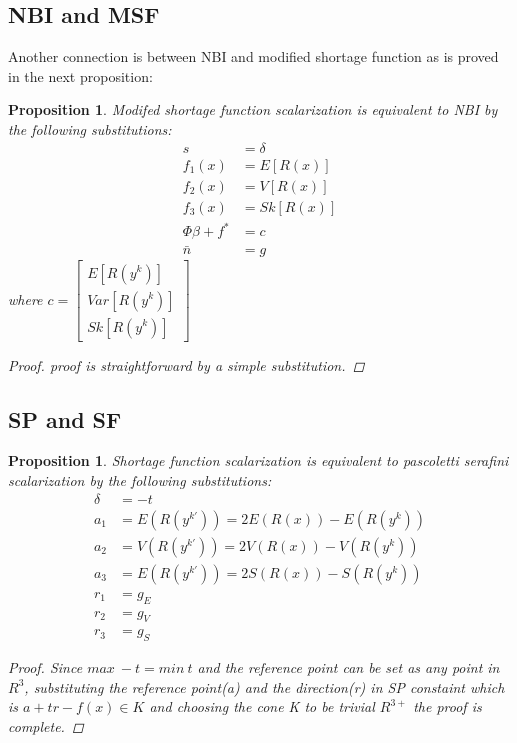 \documentclass[12pt,a4paper]{article}
\numberwithin{equation}{section}
\begin{document}
\subsection{NBI and MSF}
Another connection is between NBI and modified shortage function as is proved in the next proposition:
\renewcommand{\thesubsection}{\arabic{subsection}}
\newtheorem{NBIMSFtheorem}{Proposition}[subsection]
\begin{NBIMSFtheorem}{}\label{NBIMSFtheorem}
Modifed shortage function scalarization is equivalent to NBI by the following substitutions:
\begin{equation}
\begin{split}
s&=\delta  \\
f_{1}(x)&=E[R(x)]  \\
f_{2}(x)&=V[R(x)]  \\
f_{3}(x)&=Sk[R(x)] \\
\Phi \beta+f^{*}&=c  \\
\bar{n}&=g
\end{split}
\end{equation} 
where $c=\begin{bmatrix}
           E[R(y^{k})] \\
           Var[R(y^{k})] \\
           Sk[R(y^{k})]
         \end{bmatrix}$
\begin{proof}
proof is straightforward by a simple substitution.
\end{proof} 
\end{NBIMSFtheorem} 



\subsection{SP and SF}

\renewcommand{\thesubsection}{\arabic{subsection}}
\newtheorem{equivalencetheorem}{Proposition}[subsection]
\begin{equivalencetheorem}{}\label{equivalence}
Shortage function scalarization is equivalent to pascoletti serafini scalarization by the following substitutions:
\begin{equation}
\begin{split}
\delta&=-t  \\
a_{1}&=E(R(y^{k'}))=2E(R(x))-E(R(y^{k}))  \\
a_{2}&=V(R(y^{k'}))=2V(R(x))-V(R(y^{k}))  \\
a_{3}&=E(R(y^{k'}))=2S(R(x))-S(R(y^{k}))  \\
r_{1}&=g_{E}  \\
r_{2}&=g_{V}  \\
r_{3}&=g_{S}
\end{split}
\end{equation} 
\begin{proof}
Since $max \ -t=min \ t$ and the reference point can be set as any point in $R^3$, substituting the reference point(a) and the direction(r) in SP constaint which is $a+tr-f(x)\in K$ and choosing the cone K to be trivial $R^{3+}$ the proof is complete. 
\end{proof} 
\end{equivalencetheorem}
\end{document}
